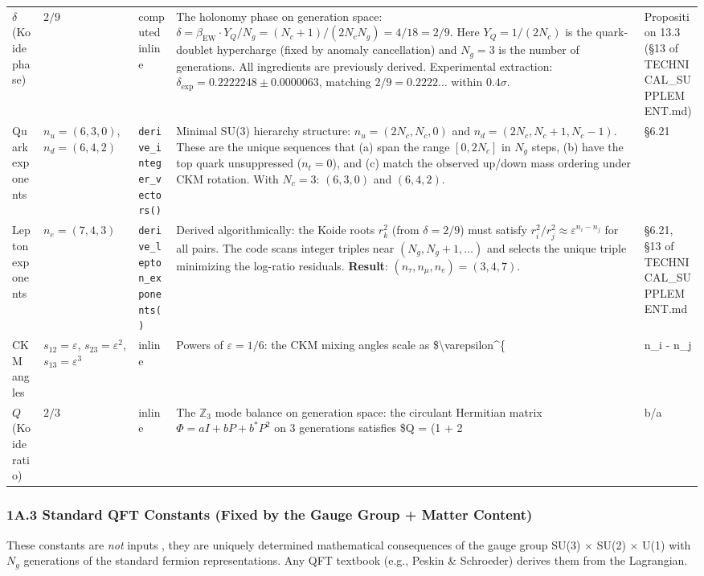 {\begin{longtable}[]{@{}lllll@{}}
\(\delta\) (Koide phase) & \(2/9\) & computed inline & The holonomy phase on generation space: \(\delta = \beta_{\text{EW}} \cdot Y_Q / N_g = (N_c+1)/(2 N_c N_g) = 4/18 = 2/9\). Here \(Y_Q = 1/(2N_c)\) is the quark-doublet hypercharge (fixed by anomaly cancellation) and \(N_g = 3\) is the number of generations. All ingredients are previously derived. Experimental extraction: \(\delta_{\text{exp}} = 0.2222248 \pm 0.0000063\), matching \(2/9 = 0.2222\ldots\) within \(0.4\sigma\). & Proposition 13.3 (§13 of TECHNICAL\_SUPPLEMENT.md) \\
Quark exponents & \(n_u = (6,3,0)\), \(n_d = (6,4,2)\) & \texttt{derive\_integer\_vectors()} & Minimal SU(3) hierarchy structure: \(n_{u} = (2N_c, N_c, 0)\) and \(n_d = (2N_c, N_c+1, N_c-1)\). These are the unique sequences that (a) span the range \([0, 2N_c]\) in \(N_g\) steps, (b) have the top quark unsuppressed (\(n_t = 0\)), and (c) match the observed up/down mass ordering under CKM rotation. With \(N_c = 3\): \((6,3,0)\) and \((6,4,2)\). & §6.21 \\
Lepton exponents & \(n_e = (7,4,3)\) & \texttt{derive\_lepton\_exponents()} & Derived algorithmically: the Koide roots \(r_k^2\) (from \(\delta = 2/9\)) must satisfy \(r_i^2/r_j^2 \approx \varepsilon^{n_i - n_j}\) for all pairs. The code scans integer triples near \((N_g, N_g+1, \ldots)\) and selects the unique triple minimizing the log-ratio residuals. \textbf{Result}: \((n_\tau, n_\mu, n_e) = (3, 4, 7)\). & §6.21, §13 of TECHNICAL\_SUPPLEMENT.md \\
CKM angles & \(s_{12} = \varepsilon\), \(s_{23} = \varepsilon^2\), \(s_{13} = \varepsilon^3\) & inline & Powers of \(\varepsilon = 1/6\): the CKM mixing angles scale as \$\textbackslash varepsilon\^{}\{ & n\_i - n\_j \\
\(Q\) (Koide ratio) & \(2/3\) & inline & The \(\mathbb{Z}_3\) mode balance on generation space: the circulant Hermitian matrix \(\Phi = a I + b P + b^* P^2\) on 3 generations satisfies \$Q = (1 + 2 & b/a \\
\end{longtable}
}

\subsubsection{1A.3 Standard QFT Constants (Fixed by the Gauge Group + Matter Content)}\label{1a3-standard-qft-constants-fixed-by-the-gauge-group--matter-content}

These constants are \emph{not} inputs , they are uniquely determined mathematical consequences of the gauge group SU(3) \(\times\) SU(2) \(\times\) U(1) with \(N_g\) generations of the standard fermion representations. Any QFT textbook (e.g., Peskin \& Schroeder) derives them from the Lagrangian.

